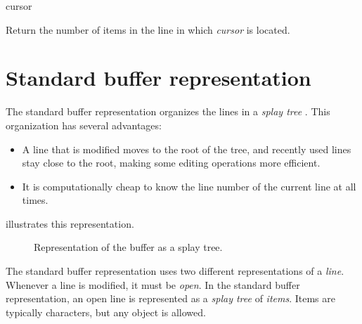  {cursor}

Return the number of items in the line in which \textit{cursor} is
located.

\section{Standard buffer representation}

The standard buffer representation organizes the lines in a
\emph{splay tree} \cite{Sleator:1985:SBS:3828.3835}.  This
organization has several advantages:

\begin{itemize}
\item A line that is modified moves to the root of the tree, and
  recently used lines stay close to the root, making some editing
  operations more efficient.
\item It is computationally cheap to know the line number of the
  current line at all times. 
\end{itemize}

 illustrates this representation.

\begin{figure}
\begin{center}
\end{center}
\caption{\label{fig-buffer}
Representation of the buffer as a splay tree.}
\end{figure}


The standard buffer representation uses two different representations
of a \emph{line}.  Whenever a line is modified, it must be
\emph{open}.  In the standard buffer representation, an open line is
represented as a \emph{splay tree} \cite{Sleator:1985:SBS:3828.3835}
of \emph{items}.  Items are typically characters, but any object is
allowed.


